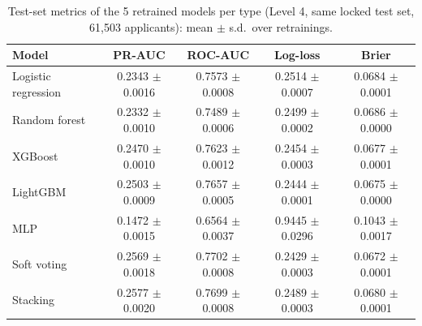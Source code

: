 \begin{table}[t]
\caption{Test-set metrics of the 5 retrained models per type (Level 4, same locked test set, 61,503 applicants): mean $\pm$ s.d.\ over retrainings.}
\label{tab:rq3_refit_metrics}
\centering
\small
\begin{tabular}{lcccc}
\hline
Model & PR-AUC & ROC-AUC & Log-loss & Brier \\
\hline
Logistic regression & 0.2343 $\pm$ 0.0016 & 0.7573 $\pm$ 0.0008 & 0.2514 $\pm$ 0.0007 & 0.0684 $\pm$ 0.0001 \\
Random forest & 0.2332 $\pm$ 0.0010 & 0.7489 $\pm$ 0.0006 & 0.2499 $\pm$ 0.0002 & 0.0686 $\pm$ 0.0000 \\
XGBoost & 0.2470 $\pm$ 0.0010 & 0.7623 $\pm$ 0.0012 & 0.2454 $\pm$ 0.0003 & 0.0677 $\pm$ 0.0001 \\
LightGBM & 0.2503 $\pm$ 0.0009 & 0.7657 $\pm$ 0.0005 & 0.2444 $\pm$ 0.0001 & 0.0675 $\pm$ 0.0000 \\
MLP & 0.1472 $\pm$ 0.0015 & 0.6564 $\pm$ 0.0037 & 0.9445 $\pm$ 0.0296 & 0.1043 $\pm$ 0.0017 \\
Soft voting & 0.2569 $\pm$ 0.0018 & 0.7702 $\pm$ 0.0008 & 0.2429 $\pm$ 0.0003 & 0.0672 $\pm$ 0.0001 \\
Stacking & 0.2577 $\pm$ 0.0020 & 0.7699 $\pm$ 0.0008 & 0.2489 $\pm$ 0.0003 & 0.0680 $\pm$ 0.0001 \\
\hline
\end{tabular}
\end{table}